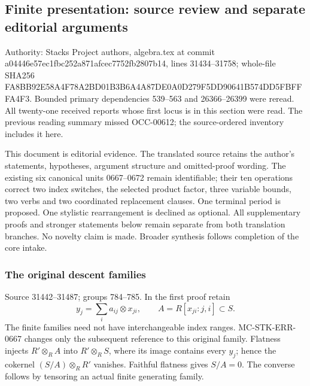 \subsection{Finite presentation: source review and separate editorial arguments}\label{algebra-proof-035-finite-presentation-source-review-and-separate-editorial-arguments}

Authority: Stacks Project authors, algebra.tex at commit a044\allowbreak{}46e5\allowbreak{}7ec1\allowbreak{}fbc2\allowbreak{}52a8\allowbreak{}71af\allowbreak{}cec7\allowbreak{}752f\allowbreak{}b280\allowbreak{}7b14, lines 31434--31758; whole-file SHA256 FA8B\allowbreak{}B92E\allowbreak{}58A4\allowbreak{}F78A\allowbreak{}2BD0\allowbreak{}1B3B\allowbreak{}6A4A\allowbreak{}87DE\allowbreak{}0A0D\allowbreak{}279F\allowbreak{}5DD9\allowbreak{}0641\allowbreak{}B574\allowbreak{}DD5F\allowbreak{}BFFF\allowbreak{}A4F3. Bounded primary dependencies 539--563 and 26366--26399 were reread. All twenty-one received reports whose first locus is in this section were read. The previous reading summary missed OCC-00612; the source-ordered inventory includes it here.

This document is editorial evidence. The translated source retains the author's statements, hypotheses, argument structure and omitted-proof wording. The existing six canonical units 0667--0672 remain identifiable; their ten operations correct two index switches, the selected product factor, three variable bounds, two verbs and two coordinated replacement clauses. One terminal period is proposed. One stylistic rearrangement is declined as optional. All supplementary proofs and stronger statements below remain separate from both translation branches. No novelty claim is made. Broader synthesis follows completion of the core intake.

\subsubsection{The original descent families}\label{algebra-proof-035-the-original-descent-families}

Source 31442--31487; groups 784--785. In the first proof retain \[
y_j=\sum_i a_{ij}\otimes x_{ji},\qquad
A=R[x_{ji}:j,i]\subset S.
\] The finite families need not have interchangeable index ranges. MC-STK-ERR-0667 changes only the subsequent reference to this original family. Flatness injects \(R'\otimes_R A\) into \(R'\otimes_R S\), where its image contains every \(y_j\); hence the cokernel \((S/A)\otimes_R R'\) vanishes. Faithful flatness gives \(S/A=0\). The converse follows by tensoring an actual finite generating family.

